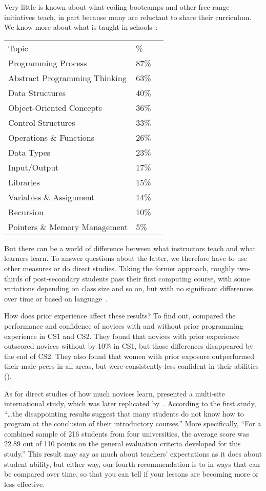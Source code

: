 Very little is known about what coding bootcamps and other free-range initiatives teach,
in part because many are reluctant to share their curriculum.
We know more about what is taught in schools~\cite{Luxt2017}:

\begin{longtable}{lll}
Topic				&   \%\\
Programming Process     	& 87\%\\
Abstract Programming Thinking	& 63\%\\
Data Structures      		& 40\%\\
Object-Oriented Concepts        & 36\%\\
Control Structures              & 33\%\\
Operations \& Functions         & 26\%\\
Data Types                      & 23\%\\
Input/Output                    & 17\%\\
Libraries                       & 15\%\\
Variables \& Assignment         & 14\%\\
Recursion                       & 10\%\\
Pointers \& Memory Management   &  5\%
\end{longtable}

But there can be a world of difference between what instructors teach and what learners learn.
To answer questions about the latter,
we therefore have to use other measures or do direct studies.
Taking the former approach,
roughly two-thirds of post-secondary students pass their first computing course,
with some variations depending on class size and so on,
but with no significant differences over time or based on language~\cite{Benn2007a,Wats2014}.

How does prior experience affect these results?
To find out,
\cite{Wilc2018} compared the performance and confidence of novices with and without prior programming experience in CS1 and CS2.
They found that novices with prior experience outscored novices without by 10\% in CS1,
but those differences disappeared by the end of CS2.
They also found that women with prior exposure outperformed their male peers in all areas,
but were consistently less confident in their abilities ().

As for direct studies of how much novices learn, \cite{McCr2001} presented a multi-site international study, which was later replicated by~\cite{Utti2013}. According to the first study, ``{\ldots}the disappointing results suggest that many students do not know how to program at the conclusion of their introductory courses.'' More specifically, ``For a combined sample of 216 students from four universities, the average score was 22.89 out of 110 points on the general evaluation criteria developed for this study.'' This result may say as much about teachers' expectations as it does about student ability, but either way, our fourth recommendation is to  in ways that can be compared over time, so that you can tell if your lessons are becoming more or less effective.

